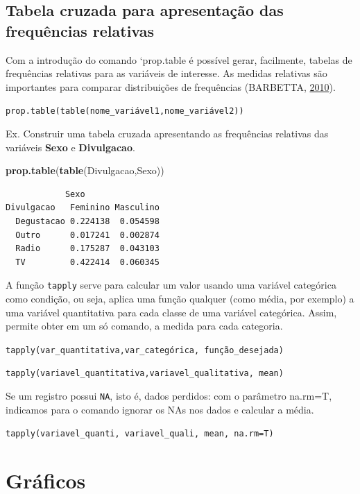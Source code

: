 \documentclass[12pt,brazil,oneside]{book}
\newenvironment{Shaded}{\begin{snugshade}}{\end{snugshade}}
\newcommand{\KeywordTok}[1]{\textcolor[rgb]{0.13,0.29,0.53}{\textbf{#1}}}
\newcommand{\NormalTok}[1]{#1}
\begin{document}
\hypertarget{tabela-cruzada-para-apresentacao-das-frequencias-relativas}{%
\subsection{Tabela cruzada para apresentação das frequências
relativas}\label{tabela-cruzada-para-apresentacao-das-frequencias-relativas}}

Com a introdução do comando `prop.table\textbar{} é possível gerar,
facilmente, tabelas de frequências relativas para as variáveis de
interesse. As medidas relativas são importantes para comparar
distribuições de frequências (BARBETTA,
\protect\hyperlink{ref-barbetta1988}{2010}).

\texttt{prop.table(table(nome\_variável1,nome\_variável2))}

Ex. Construir uma tabela cruzada apresentando as frequências relativas
das variáveis \textbf{Sexo} e \textbf{Divulgacao}.

\begin{Shaded}
\begin{Highlighting}[]
\KeywordTok{prop.table}\NormalTok{(}\KeywordTok{table}\NormalTok{(Divulgacao,Sexo))}
\end{Highlighting}
\end{Shaded}

\begin{verbatim}
            Sexo
Divulgacao   Feminino Masculino
  Degustacao 0.224138  0.054598
  Outro      0.017241  0.002874
  Radio      0.175287  0.043103
  TV         0.422414  0.060345
\end{verbatim}

A função \texttt{tapply} serve para calcular um valor usando uma
variável categórica como condição, ou seja, aplica uma função qualquer
(como média, por exemplo) a uma variável quantitativa para cada classe
de uma variável categórica. Assim, permite obter em um só comando, a
medida para cada categoria.

\texttt{tapply(var\_quantitativa,var\_categórica,\ função\_desejada)}

\texttt{tapply(variavel\_quantitativa,variavel\_qualitativa,\ mean)}

Se um registro possui \texttt{NA}, isto é, dados perdidos: com o
parâmetro na.rm=T, indicamos para o comando ignorar os NAs nos dados e
calcular a média.

\texttt{tapply(variavel\_quanti,\ variavel\_quali,\ mean,\ na.rm=T)}

\hypertarget{graficos}{%
\section{Gráficos}\label{graficos}}
\end{document}
